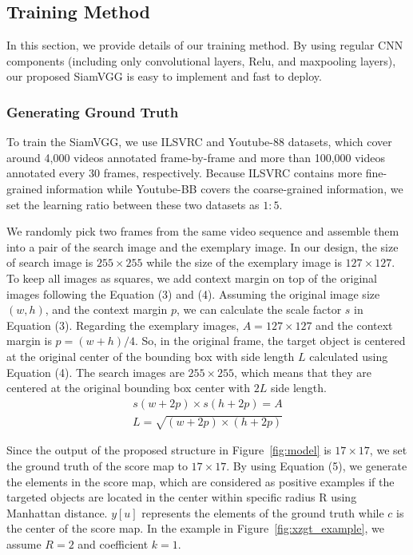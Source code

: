 \documentclass[runningheads]{llncs}
\begin{document}
\subsection{Training Method}

In this section, we provide details of our training method. By using regular CNN components (including only convolutional layers, Relu, and maxpooling layers), our proposed SiamVGG is easy to implement and fast to deploy.

\subsubsection{Generating Ground Truth}

To train the SiamVGG, we use ILSVRC and Youtube-88 datasets, which cover around 4,000 videos annotated frame-by-frame and more than 100,000 videos annotated every 30 frames, respectively. Because ILSVRC contains more fine-grained information while Youtube-BB covers the coarse-grained information, we set the learning ratio between these two datasets as $1 : 5$. 

We randomly pick two frames from the same video sequence and assemble them into a pair of the search image and the exemplary image. In our design, the size of search image is $255 \times 255$ while the size of the exemplary image is $127 \times 127$. To keep all images as squares, we add context margin on top of the original images following the Equation (3) and (4). Assuming the original image size $(w, h)$, and the context margin $p$, we can calculate the scale factor $s$ in Equation (3). 
Regarding the exemplary images, $A = 127 \times 127$ and the context margin is $p = (w + h)/4$. So, in the original frame, the target object is centered at the original center of the bounding box with side length $L$ calculated using Equation (4). The search images are $255 \times 255$, which means that they are centered at the original bounding box center with $2L$ side length. 
\begin{align}
    s(w + 2p) \times s(h + 2p) = A
\end{align}
\begin{align}
    L = \sqrt{(w + 2p) \times (h + 2p)}
\end{align}

Since the output of the proposed structure in Figure~\ref{fig:model} is $17 \times 17$, we set the ground truth of the score map to $17 \times 17$. By using Equation (5), we generate the elements in the score map, which are considered as positive examples if the targeted objects are located in the center within specific radius R using Manhattan distance. $y[u]$ represents the elements of the ground truth while $c$ is the center of the score map. In the example in Figure~\ref{fig:xzgt_example}, we assume $R = 2$ and coefficient $k = 1$.
\end{document}
